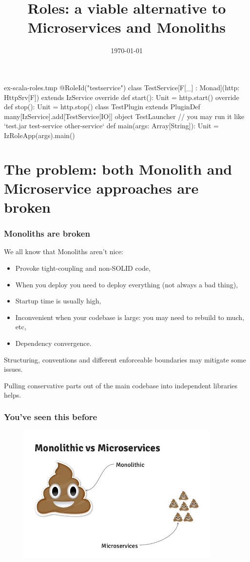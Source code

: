 \documentclass[usenames,dvipsnames]{beamer}
\title[Roles]{Roles: a viable alternative to Microservices and Monoliths}
\institute[Septimal Mind Ltd]
    {
    Septimal Mind Ltd\\
    \medskip
    \textit{team@7mind.io}
    }
\date{\today}
\begin{document}
\begin{VerbatimOut}{ex-scala-roles.tmp}
@RoleId("testservice") 
class TestService[F[_] : Monad](http: HttpSrv[F]) 
  extends IzService {
    override def start(): Unit = http.start()
    override def stop(): Unit = http.stop()
}
class TestPlugin extends PluginDef {
  many[IzService].add[TestService[IO]]
}
object TestLauncher {
  // you may run it like `test.jar test-service other-service`
  def main(args: Array[String]): Unit = IzRoleApp(args).main()
}
\end{VerbatimOut}

\begin{frame}
\titlepage
\end{frame}

\section{The problem: both Monolith and Microservice approaches are broken}

\begin{frame}
\frametitle{Monoliths are broken}
We all know that Monoliths aren't nice:
\begin{itemize}
\item Provoke tight-coupling and non-SOLID code,
\item When you deploy you need to deploy everything (not always a bad thing),
\item Startup time is usually high,
\item Inconvenient when your codebase is large: you may need to rebuild to much, etc,
\item Dependency convergence.
\end{itemize}

Structuring, conventions and different enforceable boundaries may mitigate some issues.

Pulling conservative parts out of the main codebase into independent libraries helps.
\end{frame}

\begin{frame}
\frametitle{You've seen this before}
\begin{figure}
    \includegraphics[width=0.9\textwidth]{media/mono-ms-joke.jpg}
\end{figure}
\end{frame}
\end{document}
